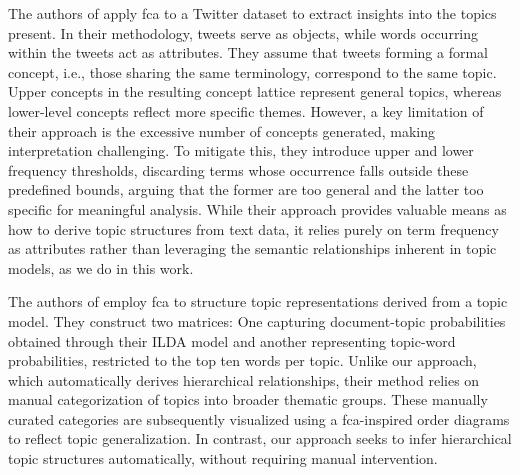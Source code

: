 The authors of \cite{cigarran_twitter_fca_2016} apply \ac{fca} to a Twitter dataset to extract insights into the topics present.
In their methodology, tweets serve as objects, while words occurring within the tweets act as attributes.
They assume that tweets forming a formal concept, i.e., those sharing the same terminology, correspond to the same topic.
Upper concepts in the resulting concept lattice represent general topics,
whereas lower-level concepts reflect more specific themes.
However, a key limitation of their approach is the excessive number of concepts generated, making interpretation challenging.
To mitigate this, they introduce upper and lower frequency thresholds,
discarding terms whose occurrence falls outside these predefined bounds,
arguing that the former are too general and the latter too specific for meaningful analysis.
While their approach provides valuable means as how to derive topic structures from text data,
it relies purely on term frequency as attributes rather than
leveraging the semantic relationships inherent in topic models, as we do in this work.

The authors of \cite{wang_topic_feature_2021} employ \ac{fca} to structure topic representations derived from a topic model.
They construct two matrices:
One capturing document-topic probabilities obtained through their ILDA model and
another representing topic-word probabilities, restricted to the top ten words per topic.
Unlike our approach, which automatically derives hierarchical relationships,
their method relies on manual categorization of topics into broader thematic groups.
These manually curated categories are subsequently visualized using a \ac{fca}-inspired order diagrams to reflect topic generalization.
In contrast, our approach seeks to infer hierarchical topic structures automatically, without requiring manual intervention.

